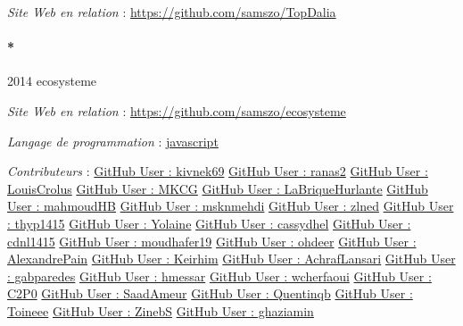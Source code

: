 \documentclass[
  a4paper,
  DIV=11,
  numbers=noendperiod]{scrreprt}
\let\oldparagraph\paragraph
\renewcommand{\paragraph}[1]{\oldparagraph{#1}\mbox{}}
\begin{document}
\emph{Site Web en relation} : \url{https://github.com/samszo/TopDalia}

\paragraph*{2014 ecosysteme}\label{sec-item301778}

\emph{Site Web en relation} : \url{https://github.com/samszo/ecosysteme}

\emph{Langage de programmation} :
\href{http://localhost/samszo/omk/s/fiches/item/89711}{javascript}

\emph{Contributeurs} :
\href{http://localhost/samszo/omk/s/fiches/item/300917}{GitHub User :
kivnek69} \href{http://localhost/samszo/omk/s/fiches/item/300919}{GitHub
User : ranas2}
\href{http://localhost/samszo/omk/s/fiches/item/300921}{GitHub User :
LouisCrolus}
\href{http://localhost/samszo/omk/s/fiches/item/300923}{GitHub User :
MKCG} \href{http://localhost/samszo/omk/s/fiches/item/300925}{GitHub
User : LaBriqueHurlante}
\href{http://localhost/samszo/omk/s/fiches/item/300927}{GitHub User :
mahmoudHB}
\href{http://localhost/samszo/omk/s/fiches/item/300929}{GitHub User :
msknmehdi}
\href{http://localhost/samszo/omk/s/fiches/item/300931}{GitHub User :
zlned} \href{http://localhost/samszo/omk/s/fiches/item/300933}{GitHub
User : thyp1415}
\href{http://localhost/samszo/omk/s/fiches/item/300935}{GitHub User :
Yolaine} \href{http://localhost/samszo/omk/s/fiches/item/300937}{GitHub
User : cassydhel}
\href{http://localhost/samszo/omk/s/fiches/item/300939}{GitHub User :
cdnl1415} \href{http://localhost/samszo/omk/s/fiches/item/300941}{GitHub
User : moudhafer19}
\href{http://localhost/samszo/omk/s/fiches/item/300943}{GitHub User :
ohdeer} \href{http://localhost/samszo/omk/s/fiches/item/300945}{GitHub
User : AlexandrePain}
\href{http://localhost/samszo/omk/s/fiches/item/300947}{GitHub User :
Keirhim} \href{http://localhost/samszo/omk/s/fiches/item/300949}{GitHub
User : AchrafLansari}
\href{http://localhost/samszo/omk/s/fiches/item/300951}{GitHub User :
gabparedes}
\href{http://localhost/samszo/omk/s/fiches/item/300953}{GitHub User :
hmessar} \href{http://localhost/samszo/omk/s/fiches/item/300955}{GitHub
User : wcherfaoui}
\href{http://localhost/samszo/omk/s/fiches/item/300957}{GitHub User :
C2P0} \href{http://localhost/samszo/omk/s/fiches/item/300959}{GitHub
User : SaadAmeur}
\href{http://localhost/samszo/omk/s/fiches/item/300961}{GitHub User :
Quentinqb}
\href{http://localhost/samszo/omk/s/fiches/item/300963}{GitHub User :
Toineee} \href{http://localhost/samszo/omk/s/fiches/item/300965}{GitHub
User : ZinebS}
\href{http://localhost/samszo/omk/s/fiches/item/300967}{GitHub User :
ghaziamin}
\end{document}
